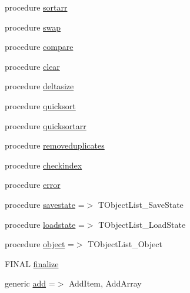\begin{DoxyCompactItemize}
procedure \mbox{\hyperlink{structobjectlists_1_1tobjectlist_a2beb671a29ddb6044450417b03b8b009}{sortarr}}
\item 
procedure \mbox{\hyperlink{structobjectlists_1_1tobjectlist_a007d847496edd63b05919d6d95c211c7}{swap}}
\item 
procedure \mbox{\hyperlink{structobjectlists_1_1tobjectlist_a4f4ec7bf2d9436a9b310f5e394130147}{compare}}
\item 
procedure \mbox{\hyperlink{structobjectlists_1_1tobjectlist_a603aba411d44edb0e8976f133ae127e4}{clear}}
\item 
procedure \mbox{\hyperlink{structobjectlists_1_1tobjectlist_a8107f86d2b34101f3ec31937ec103e9a}{deltasize}}
\item 
procedure \mbox{\hyperlink{structobjectlists_1_1tobjectlist_aca7076b5ed121e6cd038498ddebb2dd8}{quicksort}}
\item 
procedure \mbox{\hyperlink{structobjectlists_1_1tobjectlist_a6b71fa75a78c287400335250e6beffe8}{quicksortarr}}
\item 
procedure \mbox{\hyperlink{structobjectlists_1_1tobjectlist_a986073b25f79d737e1f8c8e499e7ddce}{removeduplicates}}
\item 
procedure \mbox{\hyperlink{structobjectlists_1_1tobjectlist_ac323b195517d08f9566daaa505851694}{checkindex}}
\item 
procedure \mbox{\hyperlink{structobjectlists_1_1tobjectlist_abb8002699e9d85840a93f33e6688d3a9}{error}}
\item 
procedure \mbox{\hyperlink{structobjectlists_1_1tobjectlist_a8bcdfb1721433509a4dcf6822cb8a516}{savestate}} =$>$ T\+Object\+List\+\_\+\+Save\+State
\item 
procedure \mbox{\hyperlink{structobjectlists_1_1tobjectlist_afd3d2cc200f7f707b0e3c8d6dd1d8c22}{loadstate}} =$>$ T\+Object\+List\+\_\+\+Load\+State
\item 
procedure \mbox{\hyperlink{structobjectlists_1_1tobjectlist_a6e0a4397919ad7de96f490a6accfea72}{object}} =$>$ T\+Object\+List\+\_\+\+Object
\item 
F\+I\+N\+AL \mbox{\hyperlink{structobjectlists_1_1tobjectlist_ae3080a1555340ddb78729a367fb158f5}{finalize}}
\item 
generic \mbox{\hyperlink{structobjectlists_1_1tobjectlist_a4239d36f00d83e31e90be3277d604978}{add}} =$>$ Add\+Item, Add\+Array
\end{DoxyCompactItemize}
